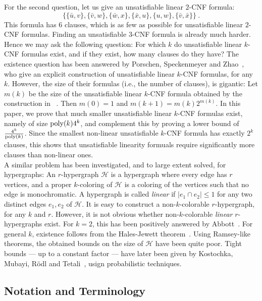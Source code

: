 \documentclass[envcountsect, envcountsame]{llncs}
\newcommand{\poly}{\ensuremath{{\rm poly}}}
\begin{document}
For the second question, let us give an unsatisfiable linear
$2$-CNF formula: 
$$
\{ \{\bar{u},v\},\{\bar{v},w\}, \{\bar{w},x\}, \{\bar{x},u\},
\{u,w\},\{\bar{v},\bar{x}\} \} \ .
$$
This formula has $6$ clauses, which is as few as possible for
unsatisfiable linear $2$-CNF formulas. Finding an unsatisfiable
$3$-CNF formula is already much harder. Hence we may ask the following
question: For which $k$ do unsatisfiable linear $k$-CNF formulas
exist, and if they exist, how many clauses do they have?  The
existence question has been answered by Porschen, Speckenmeyer and
Zhao~\cite{PSZ08}, who give an explicit construction of unsatisfiable
linear $k$-CNF formulas, for any $k$.  However, the size of their
formulas (i.e., the number of clauses), is gigantic: Let $m(k)$ be the
size of the unsatisfiable linear $k$-CNF formula obtained by the
construction in ~\cite{PSZ08}.  Then $m(0) = 1$ and $m(k+1) =
m(k)2^{m(k)}$. In this paper, we prove that much smaller unsatisfiable
linear $k$-CNF formulas exist, namely of size $\poly(k)4^k$, and
complement this by proving a lower bound of $\frac{4^k}{\poly(k)}$.
Since the smallest non-linear unsatisfiable $k$-CNF formula has
exactly $2^k$ clauses, this shows that unsatisfiable linearity
formuals require
significantly more clauses than non-linear ones.\\

A similar problem has been investigated, and to large extent solved,
for hypergraphs: An $r$-hypergraph $\mathcal{H}$ is a hypergraph where
every edge has $r$ vertices, and a proper $k$-coloring of
$\mathcal{H}$ is a coloring of the vertices such that no edge is
monochromatic. A hypergraph is called {\em linear} if $|e_1 \cap e_2|
\leq 1$ for any two distinct edges $e_1, e_2$ of $\mathcal{H}$. It is
easy to construct a non-$k$-colorable $r$-hypergraph, for any $k$ and
$r$.  However, it is not obvious whether non-$k$-colorable {\em
  linear} $r$-hypergraphs exist. For $k=2$, this has been positively
answered by Abbott~\cite{Abbott65}. For general $k$, existence follows
from the Hales-Jewett theorem~\cite{HJ63}.  Using Ramsey-like
theorems, the obtained bounds on the size of $\mathcal{H}$ have been
quite poor.  Tight bounds --- up to a constant factor --- have later
been given by Kostochka, Mubayi, R\"odl and
Tetali~\cite{KMRT01}, usign probabilistic techniques.\\

\subsection{Notation and Terminology}
\end{document}
